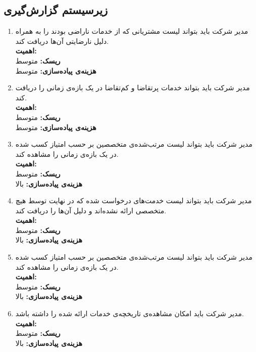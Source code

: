 \subsection{زیرسیستم گزارش‌گیری}

\begin{enumerate}

\item
مدیر شرکت باید بتواند لیست مشتریانی که از خدمات ناراضی بودند را به همراه دلیل نارضایتی آن‌ها دریافت کند.
\\
\textbf{اهمیت:} 
\\
\textbf{ریسک:} متوسط
\\
\textbf{هزینه‌ی پیاده‌سازی:} متوسط

\item
مدیر شرکت باید بتواند خدمات پرتقاضا و کم‌تقاضا در یک بازه‌ی زمانی را دریافت کند.
\\
\textbf{اهمیت:} 
\\
\textbf{ریسک:} متوسط
\\
\textbf{هزینه‌ی پیاده‌سازی:} متوسط

\item
مدیر شرکت باید بتواند لیست مرتب‌شده‌ی متخصصین بر حسب امتیاز کسب شده در یک بازه‌ی زمانی را مشاهده کند.
\\
\textbf{اهمیت:} 
\\
\textbf{ریسک:} متوسط
\\
\textbf{هزینه‌ی پیاده‌سازی:} بالا

\item
مدیر شرکت باید بتواند لیست خدمت‌های درخواست شده که در نهایت توسط هیچ متخصصی ارائه نشده‌اند و دلیل آن‌ها را دریافت کند.
\\
\textbf{اهمیت:} 
\\
\textbf{ریسک:} متوسط
\\
\textbf{هزینه‌ی پیاده‌سازی:} بالا

\item
مدیر شرکت باید بتواند لیست مرتب‌شده‌ی متخصصین بر حسب امتیاز کسب شده در یک بازه‌ی زمانی را مشاهده کند.
\\
\textbf{اهمیت:} 
\\
\textbf{ریسک:} متوسط
\\
\textbf{هزینه‌ی پیاده‌سازی:} بالا

\item
مدیر شرکت باید امکان مشاهده‌ی تاریخچه‌ی خدمات ارائه شده را داشته باشد.
\\
\textbf{اهمیت:} 
\\
\textbf{ریسک:} متوسط
\\
\textbf{هزینه‌ی پیاده‌سازی:} بالا



\end{enumerate}
